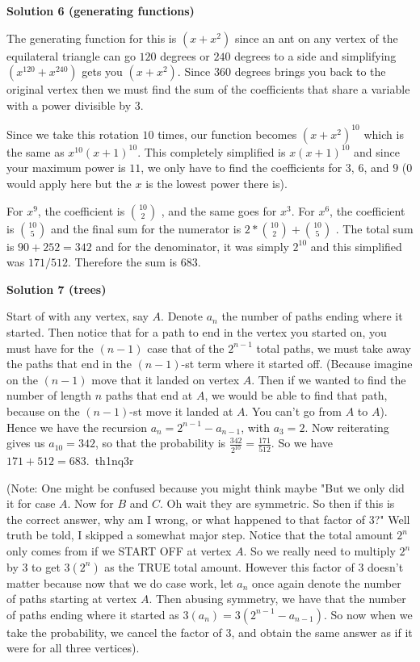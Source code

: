\begin{enumerate}
 



\textbf{Solution 6 (generating functions)}

The generating function for this is $(x+x^2)$ since an ant on any vertex of the equilateral triangle can go $120$ degrees or $240$ degrees to a side and simplifying $(x^{120}+x^{240})$ gets you $(x+x^2)$. Since $360$ degrees brings you back to the original vertex then we must find the sum of the coefficients that share a variable with a power divisible by $3$.

 Since we take this rotation $10$ times, our function becomes $(x+x^2)^{10}$ which is the same as $x^{10}(x+1)^{10}$. This completely simplified is $x(x+1)^{10}$ and since your maximum power is $11$, we only have to find the coefficients for $3$, $6$, and $9$ ($0$ would apply here but the $x$ is the lowest power there is).

 For $x^9$, the coefficient is ${10 \choose 2}$ , and the same goes for $x^3$. For $x^6$, the coefficient is ${10 \choose 5}$ and the final sum for the numerator is $2*{10 \choose 2} + {10 \choose 5}$ . The total sum is $90+252=342$ and for the denominator, it was simply $2^{10}$ and this simplified was $171/512$. Therefore the sum is $683$.

 



\textbf{Solution 7 (trees)}

Start of with any vertex, say $A$. Denote $a_n$ the number of paths ending where it started. Then notice that for a path to end in the vertex you started on, you must have for the $(n-1)$ case that of the $2^{n-1}$ total paths, we must take away the paths that end in the $(n-1)$-st term where it started off. (Because imagine on the $(n-1)$ move that it landed on vertex $A$. Then if we wanted to find the number of length $n$ paths that end at $A$, we would be able to find that path, because on the $(n-1)$-st move it landed at $A$. You can't go from $A$ to $A$). Hence we have the recursion $a_n=2^{n-1}-a_{n-1}$, with $a_3 = 2$. Now reiterating gives us $a_{10} = 342$, so that the probability is $\frac{342}{2^{10}} = \frac{171}{512}$. So we have $171 + 512 = \boxed{683}$.~th1nq3r

 (Note: One might be confused because you might think maybe "But we only did it for case $A$. Now for $B$ and $C$. Oh wait they are symmetric. So then if this is the correct answer, why am I wrong, or what happened to that factor of $3$?" Well truth be told, I skipped a somewhat major step. Notice that the total amount $2^n$ only comes from if we START OFF at vertex $A$. So we really need to multiply $2^n$ by $3$ to get $3(2^n)$ as the TRUE total amount. However this factor of $3$ doesn't matter because now that we do case work, let $a_n$ once again denote the number of paths starting at vertex $A$. Then abusing symmetry, we have that the number of paths ending where it started as $3(a_n)=3(2^{n-1}-a_{n-1})$. So now when we take the probability, we cancel the factor of $3$, and obtain the same answer as if it were for all three vertices).


\end{enumerate}
